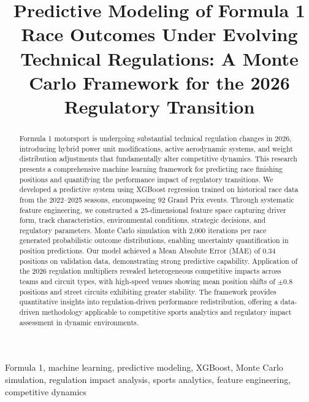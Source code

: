 \documentclass[conference]{IEEEtran}
\begin{document}
\title{Predictive Modeling of Formula 1 Race Outcomes Under Evolving Technical Regulations: A Monte Carlo Framework for the 2026 Regulatory Transition}

\author{
}

\maketitle

\begin{abstract}
Formula 1 motorsport is undergoing substantial technical regulation changes in 2026, introducing hybrid power unit modifications, active aerodynamic systems, and weight distribution adjustments that fundamentally alter competitive dynamics. This research presents a comprehensive machine learning framework for predicting race finishing positions and quantifying the performance impact of regulatory transitions. We developed a predictive system using XGBoost regression trained on historical race data from the 2022--2025 seasons, encompassing 92 Grand Prix events. Through systematic feature engineering, we constructed a 25-dimensional feature space capturing driver form, track characteristics, environmental conditions, strategic decisions, and regulatory parameters. Monte Carlo simulation with 2,000 iterations per race generated probabilistic outcome distributions, enabling uncertainty quantification in position predictions. Our model achieved a Mean Absolute Error (MAE) of 0.34 positions on validation data, demonstrating strong predictive capability. Application of the 2026 regulation multipliers revealed heterogeneous competitive impacts across teams and circuit types, with high-speed venues showing mean position shifts of $\pm$0.8 positions and street circuits exhibiting greater stability. The framework provides quantitative insights into regulation-driven performance redistribution, offering a data-driven methodology applicable to competitive sports analytics and regulatory impact assessment in dynamic environments.
\end{abstract}

\begin{IEEEkeywords}
Formula 1, machine learning, predictive modeling, XGBoost, Monte Carlo simulation, regulation impact analysis, sports analytics, feature engineering, competitive dynamics
\end{IEEEkeywords}
\end{document}

